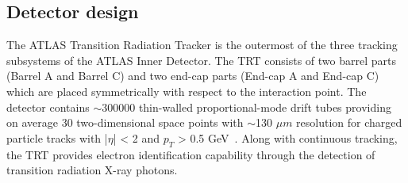 \subsection{Detector design}
\label{subsec:trt_description}
The ATLAS Transition Radiation Tracker is the outermost of the three tracking subsystems of the ATLAS Inner Detector. 
The TRT consists of two barrel parts (Barrel A and Barrel C) and two end-cap parts (End-cap A and End-cap C) 
which are placed symmetrically with respect to the interaction point.
The detector contains $\sim$300000 thin-walled proportional-mode drift tubes providing on average 30 two-dimensional 
space points with $\sim$130 $\mu m$ resolution for charged particle tracks with |$\eta$| < 2 and $p_T$ > 0.5 GeV~\cite{Abat:2008zza,Abat:2008zzb,Abat:2008zz}.
Along with continuous tracking, the TRT provides electron identification capability through the detection of transition radiation X-ray photons.





